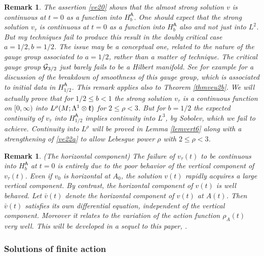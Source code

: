 \documentclass[12pt]{article}
\newtheorem{remark}[theorem]{Remark}
\def \L{\Lambda}
\def \As{\mathsf{A}}
\def \G{{\cal G}}
\def \kf{\frak k}
\def \eref{\eqref}
\numberwithin{equation}{section}
\begin{document}
 \begin{remark}\label{remweak} {\rm  
 The assertion \eref{ve20} shows that  the almost strong solution $v$
 is continuous at $t =0$ as a function into $H_b^\As$. One should expect that the strong solution $ v_\tau$ is continuous at $t =0$ 
 as a function into $H_{b}^\As$ also and not just into $L^2$. 
 But my techniques fail  to produce this result in the doubly  critical case $a=1/2, b = 1/2$.
The issue may be  
 a  conceptual one, related to the nature of the
 gauge group associated to $a=1/2$,  rather than a matter of technique.  The critical gauge group $\G_{3/2}$
 just barely fails to be a Hilbert manifold.
 See for example  \cite[Remark 5.21]{G70} for a discussion of the breakdown of smoothness
 of this gauge group, which is  associated to initial data in $H_{1/2}^\As$. This remark applies also to Theorem
 \ref{thmveu2b}.
  We will actually prove that for $1/2 \le b <1$ the strong solution $v_\tau$   
   is a continuous
  function  on $[0,\infty)$ into $L^\rho(M; \L^1\otimes \kf)$ for $2\le \rho < 3$. But    
  for $b = 1/2$    the expected
  continuity of $v_\tau$ into $H_{1/2}^\As$ implies continuity into $L^3$, by Sobolev, which we fail to achieve.
 Continuity into $L^\rho$ will be proved in Lemma \ref{lemvert6} along with a strengthening of \eref{ve22a}
 to allow Lebesgue power $\rho$ with $2 \le  \rho <3$.
 }
 \end{remark}


  
        \begin{remark}\label{horcomp}{\rm  (The horizontal component)
The failure of $v_\tau(t)$ to be continuous into $H_b^\As$ at $t = 0$  
 is entirely due
to the poor behavior of the vertical component of $v_\tau(t)$. Even if $v_0$ is horizontal at $A_0$,
the solution $v(t)$ rapidly acquires a large vertical component.
 By contrast, the horizontal component of $v(t)$ is well behaved. Let $\bar v(t)$ denote the horizontal
 component of $v(t)$ at $A(t)$. Then $\bar v(t)$ satisfies its own differential equation, 
 independent of the vertical component. Moreover it relates to the variation of the action function
 $\rho_A(t)$ very well. This will be developed in  a sequel to this paper, \cite{G72}.
}  
 \end{remark}

 
 
 
 
\subsubsection{Solutions of finite action} 
 
\end{document}
